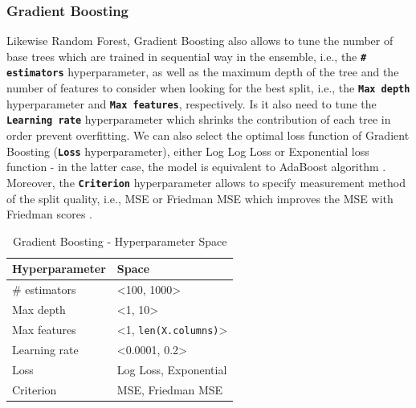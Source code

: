 \subsubsection{Gradient Boosting}
Likewise Random Forest, Gradient Boosting also allows to tune the number of base trees which are trained in sequential way in the ensemble, i.e., the \textbf{\texttt{\# estimators}} hyperparameter, as well as the maximum depth of the tree and the number of features to consider when looking for the best split, i.e., the \textbf{\texttt{Max depth}} hyperparameter and \textbf{\texttt{Max features}}, respectively.
Is it also need to tune the \textbf{\texttt{Learning rate}} hyperparameter which shrinks the contribution of each tree in order prevent overfitting.
We can also select the optimal loss function of Gradient Boosting (\textbf{\texttt{Loss}} hyperparameter), either Log Log Loss or Exponential loss function - in the latter case, the model is equivalent to AdaBoost algorithm \citep{scikit-gb}.
Moreover, the \textbf{\texttt{Criterion}} hyperparameter allows to specify measurement method of the split quality, i.e., MSE or Friedman MSE which improves the MSE with Friedman scores \citep{scikit-gb}.

\begin{table}[H]
\small
\setlength{\tabcolsep}{8pt}
\renewcommand{\arraystretch}{1.3}
\centering
    \caption[Gradient Boosting - Hyperparameter Space]{Gradient Boosting - Hyperparameter Space}\label{tab:gbspace}
    \begin{tabular}{ll}
\toprule
\textbf{Hyperparameter} & \textbf{Space}\\
\midrule
\hline
\# estimators & <100, 1000> \\
Max depth & <1, 10> \\
Max features & <1, \verb|len(X.columns)|>  \\
Learning rate & <0.0001, 0.2> \\
Loss & Log Loss, Exponential \\
Criterion & MSE, Friedman MSE \\
\hline
\bottomrule
\end{tabular}
\vspace{0.7em}

\vspace{-1em}
\end{table}

